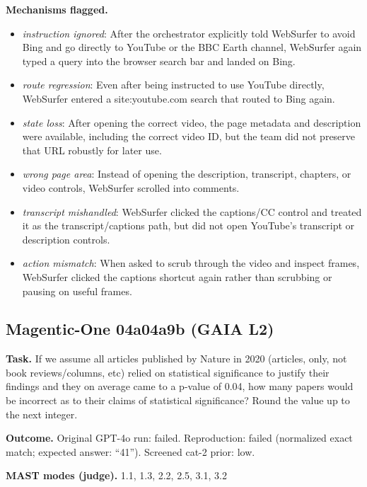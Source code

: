\textbf{Mechanisms flagged.}
\begin{itemize}
  \item \emph{instruction ignored}: After the orchestrator explicitly told WebSurfer to avoid Bing and go directly to YouTube or the BBC Earth channel, WebSurfer again typed a query into the browser search bar and landed on Bing.
  \item \emph{route regression}: Even after being instructed to use YouTube directly, WebSurfer entered a site:youtube.com search that routed to Bing again.
  \item \emph{state loss}: After opening the correct video, the page metadata and description were available, including the correct video ID, but the team did not preserve that URL robustly for later use.
  \item \emph{wrong page area}: Instead of opening the description, transcript, chapters, or video controls, WebSurfer scrolled into comments.
  \item \emph{transcript mishandled}: WebSurfer clicked the captions/CC control and treated it as the transcript/captions path, but did not open YouTube's transcript or description controls.
  \item \emph{action mismatch}: When asked to scrub through the video and inspect frames, WebSurfer clicked the captions shortcut again rather than scrubbing or pausing on useful frames.
\end{itemize}

\subsection*{Magentic-One 04a04a9b (GAIA L2)}
\textbf{Task.} If we assume all articles published by Nature in 2020 (articles, only, not book reviews/columns, etc) relied on statistical significance to justify their findings and they on average came to a p-value of 0.04, how many papers would be incorrect as to their claims of statistical significance? Round the value up to the next integer.

\textbf{Outcome.} Original GPT-4o run: failed. Reproduction: failed (normalized exact match; expected answer: ``41''). Screened cat-2 prior: low.

\textbf{MAST modes (judge).} 1.1, 1.3, 2.2, 2.5, 3.1, 3.2

